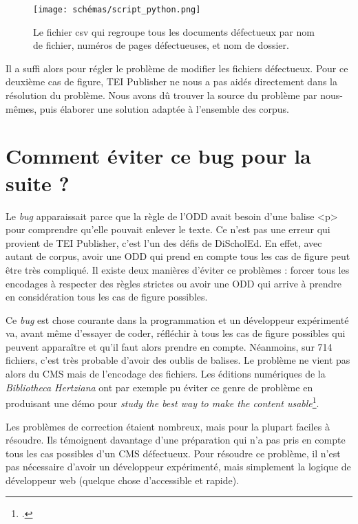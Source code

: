 \begin{figure}[H]
\centering
\texttt{[image: schémas/script\_python.png]}
\caption{Le fichier csv qui regroupe tous les documents défectueux par nom de fichier, numéros de pages défectueuses, et nom de dossier.}
\label{fig:schémas10}
\end{figure}

Il a suffi alors pour régler le problème de modifier les fichiers défectueux. Pour ce deuxième cas de figure, TEI Publisher ne nous a pas aidés directement dans la résolution du problème. Nous avons dû trouver la source du problème par nous-mêmes, puis élaborer une solution adaptée à l'ensemble des corpus.

\section{Comment éviter ce bug pour la suite ?}

Le \textit{bug} apparaissait parce que la règle de l'ODD avait besoin d'une balise <p> pour comprendre qu'elle pouvait enlever le texte. Ce n'est pas une erreur qui provient de TEI Publisher, c'est l'un des défis de DiScholEd. En effet, avec autant de corpus, avoir une ODD qui prend en compte tous les cas de figure peut être très compliqué. Il existe deux manières d'éviter ce problèmes : forcer tous les encodages à respecter des règles strictes ou avoir une ODD qui arrive à prendre en considération tous les cas de figure possibles.

Ce \textit{bug} est chose courante dans la programmation et un développeur expérimenté va, avant même d'essayer de coder, réfléchir à tous les cas de figure possibles qui peuvent apparaître et qu'il faut alors prendre en compte. Néanmoins, sur 714 fichiers, c'est très probable d'avoir des oublis de balises. Le problème ne vient pas alors du CMS mais de l'encodage des fichiers. Les éditions numériques de la \textit{Bibliotheca Hertziana} ont par exemple pu éviter ce genre de problème en produisant une démo pour \og{}\textit{study the best way to make the content usable}\fg{}\footcite{epapers4200}.

Les problèmes de correction étaient nombreux, mais pour la plupart faciles à résoudre. Ils témoignent davantage d'une préparation qui n'a pas pris en compte tous les cas possibles d'un CMS défectueux. Pour résoudre ce problème, il n’est pas nécessaire d'avoir un développeur expérimenté, mais simplement la logique de développeur web (quelque chose d'accessible et rapide). 

